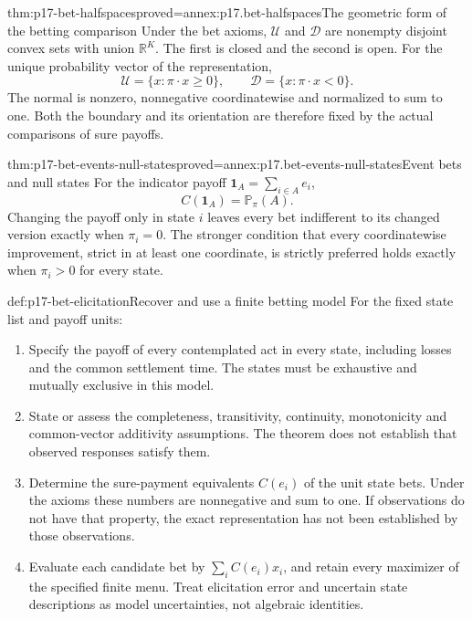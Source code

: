 \begin{hbtheorem}{thm:p17-bet-halfspaces}{proved=annex:p17.bet-halfspaces}{The geometric form of the betting comparison}
Under the bet axioms, \(\mathcal U\) and \(\mathcal D\) are
nonempty disjoint convex sets with union \(\mathbb R^K\).
The first is closed and the second is open. For the unique probability
vector of the representation,
\[
          \mathcal U=\{x:\pi\cdot x\geq0\},\qquad
          \mathcal D=\{x:\pi\cdot x<0\}.
\]
The normal is nonzero, nonnegative coordinatewise and normalized to
sum to one. Both the boundary and its orientation are therefore fixed
by the actual comparisons of sure payoffs.
\end{hbtheorem}

\begin{hbtheorem}{thm:p17-bet-events-null-states}{proved=annex:p17.bet-events-null-states}{Event bets and null states}
For the indicator payoff \(\mathbf1_A=\sum_{i\in A}e_i\),
\[
                         C(\mathbf1_A)=\mathbb P_\pi(A).
\]
Changing the payoff only in state \(i\) leaves every bet indifferent
to its changed version exactly when \(\pi_i=0\).
The stronger condition that every coordinatewise improvement, strict
in at least one coordinate, is strictly preferred holds exactly when
\(\pi_i>0\) for every state.
\end{hbtheorem}

\begin{hbmethod}{def:p17-bet-elicitation}{Recover and use a finite betting model}
For the fixed state list and payoff units:
\begin{enumerate}
\item Specify the payoff of every contemplated act in every state, including
losses and the common settlement time. The states must be exhaustive and
mutually exclusive in this model.
\item State or assess the completeness, transitivity, continuity, monotonicity
and common-vector additivity assumptions. The theorem does not establish
that observed responses satisfy them.
\item Determine the sure-payment equivalents \(C(e_i)\) of the unit
state bets. Under the axioms these numbers are nonnegative and sum to one.
If observations do not have that property, the exact representation has
not been established by those observations.
\item Evaluate each candidate bet by \(\sum_iC(e_i)x_i\), and retain
every maximizer of the specified finite menu. Treat elicitation error and
uncertain state descriptions as model uncertainties, not algebraic identities.
\end{enumerate}
\end{hbmethod}

